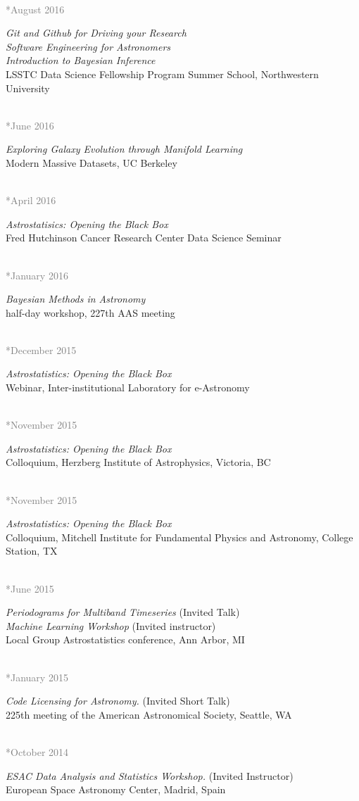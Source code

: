 \documentclass{article} %
\newlength\sidebarwidth
\newcommand{\dateonly}[2][]
	 {\begin{minipage}{\textwidth}
	 \vspace*{.4\baselineskip}
         \nopagebreak\hspace{0in}%
         \nopagebreak\begin{minipage}[t]{\sidebarwidth - .2cm}
         \raggedleft {~}
         {\\[-\baselineskip] \textcolor{gray}{\footnotesize #1}}
	 \end{minipage}%
	 \hfill
	 \begin{minipage}[t]{\linewidth - \sidebarwidth}
	 #2%
	 \end{minipage}%
	 \vspace*{.2\baselineskip plus 1\baselineskip minus
	 .2\baselineskip}%
	 \end{minipage}}
\begin{document}
  \dateonly[**August 2016]{
      {\it Git and Github for Driving your Research}\\
      {\it Software Engineering for Astronomers}\\
      {\it Introduction to Bayesian Inference}\\
      LSSTC Data Science Fellowship Program Summer School, Northwestern University
  }

  \dateonly[**June 2016]{
      {\it Exploring Galaxy Evolution through Manifold Learning}\\
      Modern Massive Datasets, UC Berkeley
  }

  \dateonly[**April 2016]{
      {\it Astrostatisics: Opening the Black Box}\\
      Fred Hutchinson Cancer Research Center Data Science Seminar
  }

  \dateonly[**January 2016]{
      {\it Bayesian Methods in Astronomy}\\
      half-day workshop, 227th AAS meeting
  }

  \dateonly[**December 2015]{
      {\it Astrostatistics: Opening the Black Box}\\
      Webinar, Inter-institutional Laboratory for e-Astronomy
  }

  \dateonly[**November 2015]{
      {\it Astrostatistics: Opening the Black Box}\\
      Colloquium, Herzberg Institute of Astrophysics, Victoria, BC
  }

  \dateonly[**November 2015]{
      {\it Astrostatistics: Opening the Black Box}\\
      Colloquium, Mitchell Institute for Fundamental Physics and Astronomy, College Station, TX
  }

  \dateonly[**June 2015]{
      {\it Periodograms for Multiband Timeseries} (Invited Talk)\\
      {\it Machine Learning Workshop} (Invited instructor)\\
      Local Group Astrostatistics conference, Ann Arbor, MI
    }

  \dateonly[**January 2015]{
    {\it Code Licensing for Astronomy.} (Invited Short Talk)\\
    225th meeting of the American Astronomical Society, Seattle, WA
  }

  \dateonly[**October 2014]{
    {\it ESAC Data Analysis and Statistics Workshop.} (Invited Instructor)\\
    European Space Astronomy Center, Madrid, Spain
  }
\end{document}
